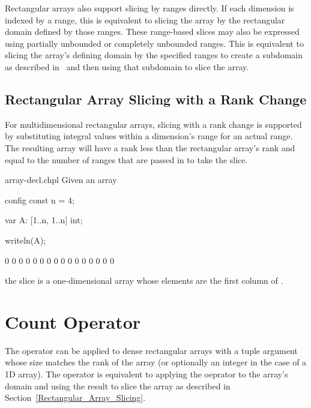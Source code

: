 Rectangular arrays also support slicing by ranges directly.  If each
dimension is indexed by a range, this is equivalent to slicing the
array by the rectangular domain defined by those ranges.  These
range-based slices may also be expressed using partially unbounded or
completely unbounded ranges.  This is equivalent to slicing the
array's defining domain by the specified ranges to create a subdomain
as described in~ and then using that subdomain to slice
the array.

\subsection{Rectangular Array Slicing with a Rank Change}
\label{Rectangular_Array_Slicing_With_Rank_Change}

For multidimensional rectangular arrays, slicing with a rank change is
supported by substituting integral values within a dimension's range
for an actual range.  The resulting array will have a rank less than
the rectangular array's rank and equal to the number of ranges that are
passed in to take the slice.

\begin{chapelexample}{array-decl.chpl}
Given an array
\begin{chapelpre}
config const n = 4;
\end{chapelpre}
\begin{chapel}
var A: [1..n, 1..n] int;
\end{chapel}
\begin{chapelpost}
writeln(A);
\end{chapelpost}
\begin{chapeloutput}
0 0 0 0
0 0 0 0
0 0 0 0
0 0 0 0
\end{chapeloutput}
the slice  is a one-dimensional array whose elements
are the first column of .
\end{chapelexample}


\section{Count Operator}
\label{Count_Operator_Arrays}
The \chpl{#} operator can be applied to dense rectangular arrays with
a tuple argument whose size matches the rank of the array (or
optionally an integer in the case of a 1D array).  The operator is
equivalent to applying the \chpl{#} oeprator to the array's domain and
using the result to slice the array as described in
Section~\ref{Rectangular_Array_Slicing}.


